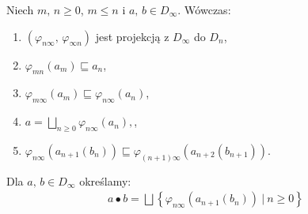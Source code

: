 \begin{fakt}\label{fact:projection}%
Niech \(m,\,n\geq 0\), \(m\leq n\) i \(a,\,b\in D_\infty\). Wówczas:
\begin{enumerate}[label={(\roman*)}, ref={(\roman*)}] 
  \setlength\itemsep{0em}
  \item \((\varphi_{n\infty},\,\varphi_{\infty n})\) jest projekcją z \(D_\infty\) do \(D_n\),\label{fact:projection_1}
\item \(\varphi_{mn}(a_m)\sqsubseteq a_n\),
\item \(\varphi_{m\infty}(a_m)\sqsubseteq \varphi_{n\infty}(a_n)\),
\item \(a=\bigsqcup_{n\geq 0}\varphi_{n\infty}(a_n),\),
\item \(\varphi_{n\infty}(a_{n+1}(b_n))\sqsubseteq\varphi_{(n+1)\infty}(a_{n+2}(b_{n+1}))\).
\end{enumerate}
\end{fakt}

\begin{definicja}%
  Dla \(a,\,b\in D_\infty\) określamy:
\begin{align*}
a \bullet b = \bigsqcup\left\{\varphi_{n\infty}(a_{n+1}(b_n))\ |\ n\geq 0\right\}\tag{\textasteriskcentered}
\end{align*}
\end{definicja}


